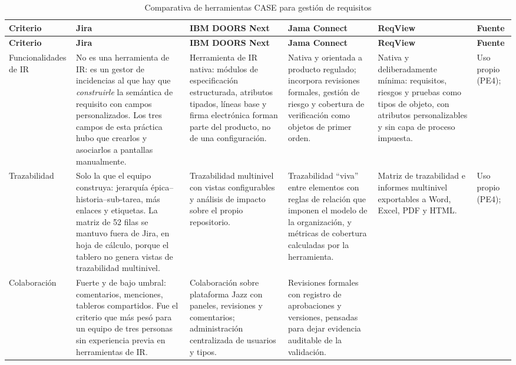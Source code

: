 \documentclass[11pt,letterpaper]{article}
\begin{document}
{\scriptsize
\begin{longtable}{L{1.9cm} L{2.5cm} L{2.5cm} L{2.5cm} L{2.5cm} L{1.5cm}}
\caption{Comparativa de herramientas CASE para gestión de requisitos}\\
\toprule
\textbf{Criterio} & \textbf{Jira} & \textbf{IBM DOORS Next} & \textbf{Jama Connect} & \textbf{ReqView} & \textbf{Fuente}\\
\midrule
\endfirsthead
\toprule
\textbf{Criterio} & \textbf{Jira} & \textbf{IBM DOORS Next} & \textbf{Jama Connect} & \textbf{ReqView} & \textbf{Fuente}\\
\midrule
\endhead
\bottomrule
\endfoot
Funcionalidades de IR
& No es una herramienta de IR: es un gestor de incidencias al que hay que \emph{construirle} la semántica de requisito con campos personalizados. Los tres campos de esta práctica hubo que crearlos y asociarlos a pantallas manualmente.
& Herramienta de IR nativa: módulos de especificación estructurada, atributos tipados, líneas base y firma electrónica forman parte del producto, no de una configuración.
& Nativa y orientada a producto regulado; incorpora revisiones formales, gestión de riesgo y cobertura de verificación como objetos de primer orden.
& Nativa y deliberadamente mínima: requisitos, riesgos y pruebas como tipos de objeto, con atributos personalizables y sin capa de proceso impuesta.
& Uso propio (PE4); \cite{ibmdoorsnext,jamatrace,reqview}\\
\midrule
Trazabilidad
& Solo la que el equipo construya: jerarquía épica--historia--sub-tarea, más enlaces y etiquetas. La matriz de 52 filas se mantuvo fuera de Jira, en hoja de cálculo, porque el tablero no genera vistas de trazabilidad multinivel.
& Trazabilidad multinivel con vistas configurables y análisis de impacto sobre el propio repositorio.
& Trazabilidad ``viva'' entre elementos con reglas de relación que imponen el modelo de la organización, y métricas de cobertura calculadas por la herramienta.
& Matriz de trazabilidad e informes multinivel exportables a Word, Excel, PDF y HTML.
& Uso propio (PE4); \cite{ibmdoorsnext,jamatrace,reqview}\\
\midrule
Colaboración
& Fuerte y de bajo umbral: comentarios, menciones, tableros compartidos. Fue el criterio que más pesó para un equipo de tres personas sin experiencia previa en herramientas de IR.
& Colaboración sobre plataforma Jazz con paneles, revisiones y comentarios; administración centralizada de usuarios y tipos.
& Revisiones formales con registro de aprobaciones y versiones, pensadas para dejar evidencia auditable de la validación.

\end{longtable}}
\end{document}
